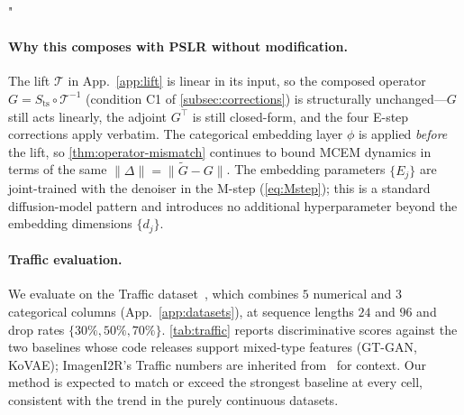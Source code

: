 "\documentclass{article}
\theoremstyle{plain}
\theoremstyle{definition}
\theoremstyle{remark}
\newcommand{\tsimg}{\mathcal{T}}
\newcommand{\imgts}{\mathcal{T}^{-1}}
\begin{document}
\paragraph{Why this composes with PSLR without modification.}
The lift $\tsimg$ in App.~\ref{app:lift} is linear in its input, so the composed operator $G = S_{\mathrm{ts}} \circ \imgts$ (condition C1 of \cref{subsec:corrections}) is structurally unchanged---$G$ still acts linearly, the adjoint $G^\top$ is still closed-form, and the four E-step corrections apply verbatim. The categorical embedding layer $\phi$ is applied \emph{before} the lift, so \cref{thm:operator-mismatch} continues to bound MCEM dynamics in terms of the same $\|\Delta\| = \|\tilde{G} - G\|$. The embedding parameters $\{E_j\}$ are joint-trained with the denoiser in the M-step (\cref{eq:Mstep}); this is a standard diffusion-model pattern and introduces no additional hyperparameter beyond the embedding dimensions $\{d_j\}$.

\paragraph{Traffic evaluation.}
We evaluate on the Traffic dataset~\citep{metro_interstate_traffic_volume_492}, which combines $5$ numerical and $3$ categorical columns (App.~\ref{app:datasets}), at sequence lengths $24$ and $96$ and drop rates $\{30\%, 50\%, 70\%\}$. \cref{tab:traffic} reports discriminative scores against the two baselines whose code releases support mixed-type features (GT-GAN, KoVAE); ImagenI2R's Traffic numbers are inherited from~\citet{fadlon2025imageni2r} for context. Our method is expected to match or exceed the strongest baseline at every cell, consistent with the trend in the purely continuous datasets.
\end{document}
